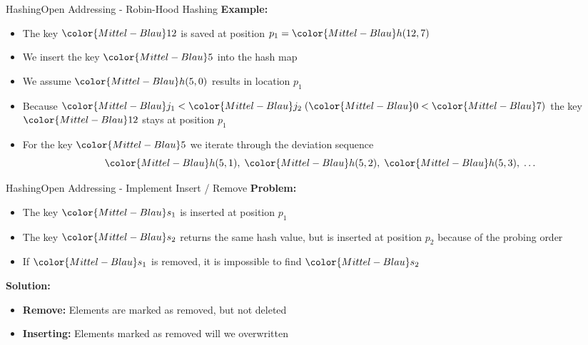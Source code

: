 
\begin{frame}{Hashing}{Open Addressing - Robin-Hood Hashing}
  \textbf{Example:}
  \begin{itemize}
    \item
      The key ${\color{Mittel-Blau}12}$ is saved at position
      $p_1 = {\color{Mittel-Blau}h(12, 7)}$
    \item
      We insert the key ${\color{Mittel-Blau}5}$ into the hash map
    \item
      We assume ${\color{Mittel-Blau}h(5,0)}$ results in location $p_1$
    \item
      Because
      \begin{math}
        {\color{Mittel-Blau}j_1} < {\color{Mittel-Blau}j_2} \;
        ({\color{Mittel-Blau}0} < {\color{Mittel-Blau}7})
      \end{math}
      the key ${\color{Mittel-Blau}12}$ stays at position $p_1$
    \item
      For the key ${\color{Mittel-Blau}5}$ we iterate through the deviation
      sequence
      \begin{displaymath}
        {\color{Mittel-Blau}h(5, 1)} ,\;
        {\color{Mittel-Blau}h(5, 2)} ,\;
        {\color{Mittel-Blau}h(5, 3)} ,\;
        \dots
      \end{displaymath}
  \end{itemize}
\end{frame}


\begin{frame}{Hashing}{Open Addressing - Implement Insert / Remove}
  \textbf{Problem:}
  \begin{itemize}
    \item
      The key ${\color{Mittel-Blau}s_1}$ is inserted at position $p_1$
    \item
      The key ${\color{Mittel-Blau}s_2}$ returns the same hash value,
      but is inserted at position $p_2$ because of the probing order
    \item
      If ${\color{Mittel-Blau}s_1}$ is removed, it is impossible to find
      ${\color{Mittel-Blau}s_2}$
  \end{itemize}
  \vspace{1.0em}
  \textbf{Solution:}
  \begin{itemize}
    \item
      \textbf{Remove:}
      Elements are marked as removed, but not deleted
    \item
      \textbf{Inserting:}
      Elements marked as removed will we overwritten
  \end{itemize}
\end{frame}

